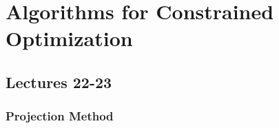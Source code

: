 \section{Algorithms for Constrained Optimization}
\subsection{Lectures 22-23}
\subsubsection{Projection Method}
